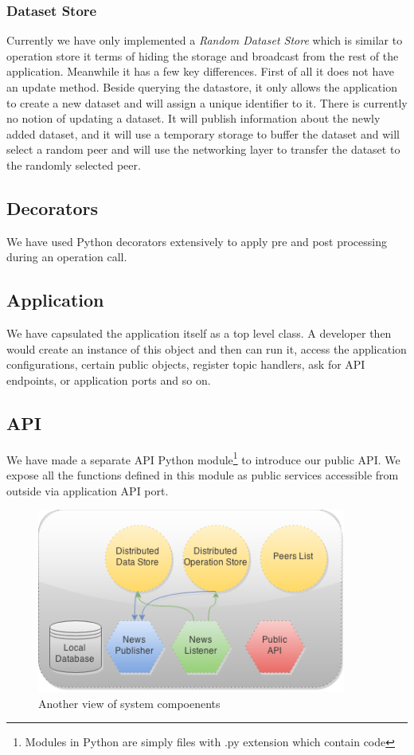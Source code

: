\subsubsection{Dataset Store}
Currently we have only implemented a \textit{Random Dataset Store} which is similar to operation store it terms of
hiding the storage and broadcast from the rest of the application.
Meanwhile it has a few key differences.
First of all it does not have an update method. 
Beside querying the datastore, 
it only allows the application to create a new dataset and will assign a unique identifier to it.
There is currently no notion of updating a dataset.
It will publish information about the newly added dataset, 
and it will use a temporary storage to buffer the dataset and will select a random peer
and will use the networking layer to transfer the dataset to the randomly selected peer.

\subsection{Decorators}
We have used Python decorators extensively to apply pre and post processing during an operation call.

\subsection{Application}
We have capsulated the application itself as a top level class. 
A developer then would create an instance of this object and then can run it,
access the application configurations, certain public objects,
register topic handlers, ask for API endpoints, or application ports and so on.

\subsection{API}
We have made a separate API Python module\footnote{Modules in Python are simply files with .py extension which contain code}
to introduce our public API. 
We expose all the functions defined in this module as public services accessible from outside via application API port.

\begin{figure}[h]
  \centering
  \includegraphics[width=4in]{poster/figures/sys.png}
  \caption[Another view of system compoenents]
   {Another view of system compoenents}
\end{figure}


